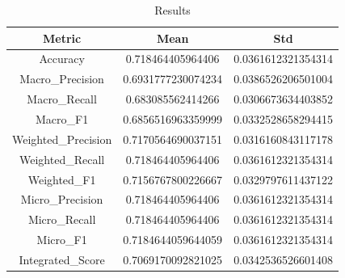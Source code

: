 \begin{table}[htbp]
\centering
\caption{Results}
\label{tab:csv}
\small
\setlength{\tabcolsep}{4pt}
\begin{tabular}{|c|c|c|}
\hline
Metric & Mean & Std \\
\hline
Accuracy & 0.718464405964406 & 0.0361612321354314 \\
Macro_Precision & 0.6931777230074234 & 0.0386526206501004 \\
Macro_Recall & 0.683085562414266 & 0.0306673634403852 \\
Macro_F1 & 0.6856516963359999 & 0.0332528658294415 \\
Weighted_Precision & 0.7170564690037151 & 0.0316160843117178 \\
Weighted_Recall & 0.718464405964406 & 0.0361612321354314 \\
Weighted_F1 & 0.7156767800226667 & 0.0329797611437122 \\
Micro_Precision & 0.718464405964406 & 0.0361612321354314 \\
Micro_Recall & 0.718464405964406 & 0.0361612321354314 \\
Micro_F1 & 0.7184644059644059 & 0.0361612321354314 \\
Integrated_Score & 0.7069170092821025 & 0.0342536526601408 \\
\hline
\end{tabular}
\end{table}
